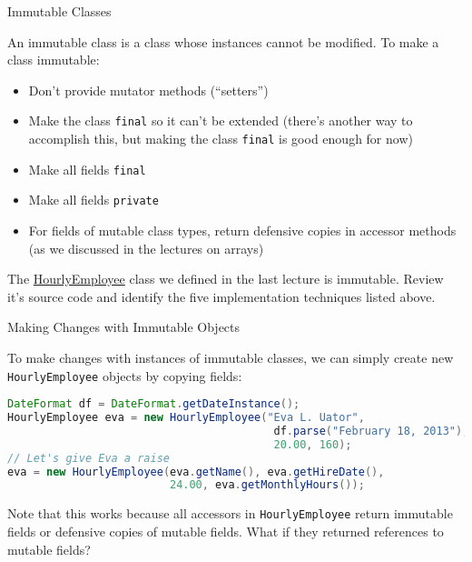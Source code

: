 \documentclass{beamer}
\newcommand{\code}{http://www.cc.gatech.edu/~simpkins/teaching/gatech/cs1331/code}
\begin{document}
\begin{frame}[fragile]{Immutable Classes}


An immutable class is a class whose instances cannot be modified.  To make a class immutable:

\begin{itemize}
\item Don't provide mutator methods (``setters'')
\item Make the class {\tt final} so it can't be extended (there's another way to accomplish this, but making the class {\tt final} is good enough for now)
\item Make all fields {\tt final}
\item Make all fields {\tt private}
\item For fields of mutable class types, return defensive copies in accessor methods (as we discussed in the lectures on arrays)
\end{itemize}

The \href{\code/HourlyEmployee.java}{HourlyEmployee} class we defined in the last lecture is immutable.  Review it's source code and identify the five implementation techniques listed above.

\end{frame}

\begin{frame}[fragile]{Making Changes with Immutable Objects}


To make changes with instances of immutable classes, we can simply create new {\tt HourlyEmployee} objects by copying fields:
\begin{lstlisting}[language=Java]
DateFormat df = DateFormat.getDateInstance();
HourlyEmployee eva = new HourlyEmployee("Eva L. Uator",
                                         df.parse("February 18, 2013"),
                                         20.00, 160);
// Let's give Eva a raise
eva = new HourlyEmployee(eva.getName(), eva.getHireDate(),
                         24.00, eva.getMonthlyHours());
\end{lstlisting}

Note that this works because all accessors in {\tt HourlyEmployee} return immutable fields or defensive copies of mutable fields.  What if they returned references to mutable fields?

\end{frame}
\end{document}
